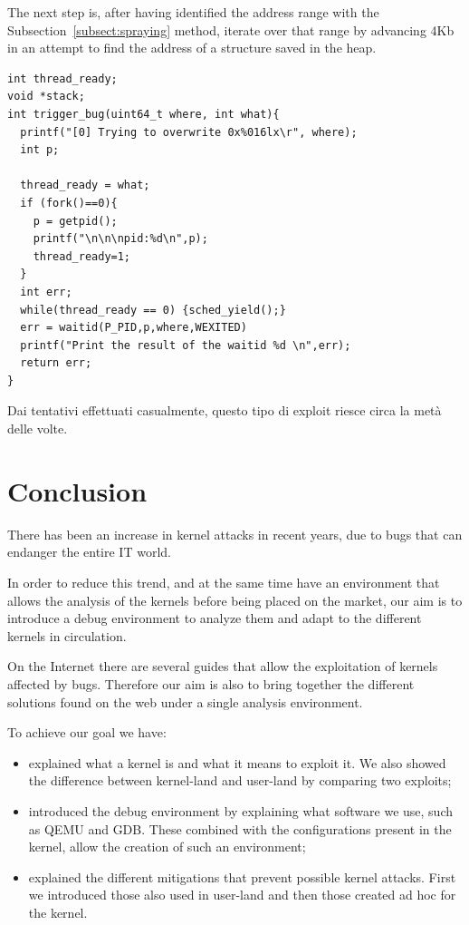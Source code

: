 \documentclass{masterthesis}
\newcommand{\refToSubSection}[1]{Subsection~\ref{subsect:#1}\xspace}
\begin{document}
The next step is, after having identified the address range with the \refToSubSection{spraying} method, iterate over that range by advancing 4Kb in an attempt to find the address of a structure saved in the heap.
\begin{lstlisting}
int thread_ready;
void *stack;
int trigger_bug(uint64_t where, int what){
  printf("[0] Trying to overwrite 0x%016lx\r", where);
  int p;
  
  thread_ready = what;
  if (fork()==0){
    p = getpid();
    printf("\n\n\npid:%d\n",p);
    thread_ready=1;
  }
  int err;
  while(thread_ready == 0) {sched_yield();}
  err = waitid(P_PID,p,where,WEXITED)
  printf("Print the result of the waitid %d \n",err);  
  return err;
}
\end{lstlisting}
Dai tentativi effettuati casualmente, questo tipo di exploit riesce circa la metà delle volte.
\chapter{Conclusion}
There has been an increase in kernel attacks in recent years, due to bugs that can endanger the entire IT world.

In order to reduce this trend, and at the same time have an environment that allows the analysis of the kernels before being placed on the market, our aim is to introduce a debug environment to analyze them and adapt to the different kernels in circulation.

On the Internet there are several guides that allow the exploitation of kernels affected by bugs. Therefore our aim is also to bring together the different solutions found on the web under a single analysis environment.

To achieve our goal we have:
\begin{itemize}
\item explained what a kernel is and what it means to exploit it.  We also showed the difference between kernel-land and user-land by comparing two exploits;
\item introduced the debug environment by explaining what software we use, such as QEMU and GDB.  These combined with the configurations present in the kernel, allow the creation of such an environment;
\item explained the different mitigations that prevent possible kernel attacks.  First we introduced those also used in user-land and then those created ad hoc for the kernel.
\end{itemize}
\end{document}
